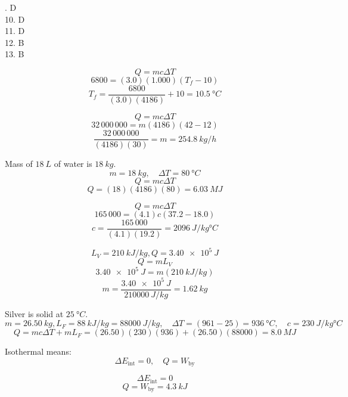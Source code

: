 \documentclass[11pt]{homework}
\begin{document}
\maketitle

\renewcommand{\questiontype}{MisConcQ}
\setcounter{questionCounter}{0}

.  D\\
10. D\\
11. D\\
12. B\\
13. B

\renewcommand{\questiontype}{Problem}
\setcounter{questionCounter}{0}

\question
\[
Q=mc \Delta T
\]
\[
6800 = (3.0)(1.000)(T_f - 10)
\]
\[
T_f = \frac{6800}{(3.0)(4186)} + 10 = \boxed{\qty{10.5}{\degree C}}
\]




\setcounter{questionCounter}{5}
\question
\[
Q=mc \Delta T
\]
\[
32\,000\,000 = m(4186)(42-12)
\]
\[
\frac{32\,000\,000}{(4186)(30)} = m = \boxed{\qty{254.8}{kg / h}}
\]

\setcounter{questionCounter}{7}
\question
Mass of $\qty{18}{L}$ of water is $\qty{18}{kg}$.
\[
m= \qty{18}{kg}, \quad \Delta T = \qty{80}{\degree C}
\]
\[
Q=mc \Delta T
\]
\[
Q = (18)(4186)(80) = \boxed{\qty{6.03}{MJ}}
\]


\question
\[
Q=mc\Delta T
\]
\[
165\,000 = (4.1)c(37.2-18.0)
\]
\[
c = \frac{165\,000}{(4.1)(19.2)}=\boxed{\qty{2096}{J / kg \degree C}}
\]


\setcounter{questionCounter}{19}
\question
\[
L_V = \qty{210}{kJ / kg},  Q = \qty{3.40e5}{J}
\]
\[
Q=mL_V
\]
\[
    \qty{3.40e5}{J} = m(\qty{210}{kJ /kg})
\]
\[
    m = \frac{\qty{3.40e5}{J}}{\qty{210000}{J /kg}}=\boxed{\qty{1.62}{kg}}
\]


\question
Silver is solid at $\qty{25}{\degree C}$.
\[
m = \qty{26.50}{kg}, L_F = \qty{88}{kJ / kg} = \qty{88000}{J / kg}, \quad \Delta T = (961-25) = \qty{936}{\degree C}, \quad c = \qty{230}{J / kg \degree C}
\]
\[
Q= mc\Delta T + mL_F = (26.50)(230)(936) + (26.50)(88000) = \boxed{\qty{8.0}{MJ}}
\]


\setcounter{questionCounter}{31}
\question
Isothermal means:
\[
\Delta E_{\text{int}} = 0, \quad Q = W_{\text{by}}
\]
\begin{alphaparts}
\questionpart
\[
    \boxed{\Delta E_{\text{int}} = 0}
\]
\questionpart
\[
Q = W_{\text{by}}= \boxed{\qty{4.3}{kJ}}
\]


\end{alphaparts}
\end{document}
